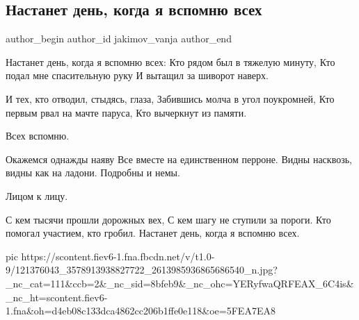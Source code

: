  
 
 
 
 
 
\subsection{Настанет день, когда я вспомню всех}
\label{sec:12_10_2020.fb.jakimov_vanja.1.nastanet_den_vspomnj_vseh}
\ifcmt
	author_begin
   author_id jakimov_vanja
	author_end
\fi

\begin{multicols}{2}
	\obeycr
Настанет день, когда я вспомню всех:
Кто рядом был в тяжелую минуту,
Кто подал мне спасительную руку
И вытащил за шиворот наверх.

И тех, кто отводил, стыдясь, глаза,
Забившись молча в угол поукромней,
Кто первым рвал на мачте паруса,
Кто вычеркнут из памяти.

Всех вспомню.

Окажемся однажды наяву
Все вместе на единственном перроне.
Видны насквозь, видны как на ладони.
Подробны и немы.

Лицом к лицу.

С кем тысячи прошли дорожных вех,
С кем шагу не ступили за пороги.
Кто помогал участием, кто гробил.
Настанет день, когда я вспомню всех.
	\restorecr
\end{multicols}

\ifcmt
pic https://scontent.fiev6-1.fna.fbcdn.net/v/t1.0-9/121376043_3578913938827722_2613985936865686540_n.jpg?_nc_cat=111&ccb=2&_nc_sid=8bfeb9&_nc_ohc=YERyfwaQRFEAX_6C4is&_nc_ht=scontent.fiev6-1.fna&oh=d4eb08c133dca4862cc206b1ffe0e118&oe=5FEA7EA8
\fi
